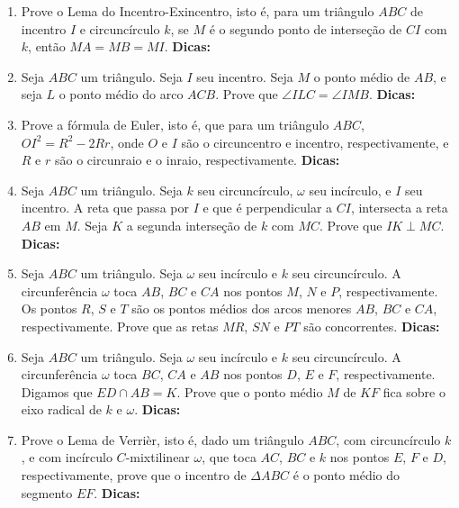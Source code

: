 \documentclass{article}
\newcommand{\dica}{\textbf{Dicas:}}
\newcommand{\iniTri}{Seja $ABC$ um triângulo}
\begin{document}
\begin{multicols}{2}
\begin{enumerate}
    \item Prove o Lema do Incentro-Exincentro, isto é, para um triângulo $ABC$ de incentro $I$ e circuncírculo $k$, se $M$ é o segundo ponto de interseção de $CI$ com $k$, então $MA=MB=MI$. \dica %
    
    \item \iniTri. Seja $I$ seu incentro. Seja $M$ o ponto médio de $AB$, e seja $L$ o ponto médio do arco $ACB$. Prove que $\angle ILC=\angle IMB$. \dica %
    
    \item Prove a fórmula de Euler, isto é, que para um triângulo $ABC$, $OI^2=R^2-2Rr$, onde $O$ e $I$ são o circuncentro e incentro, respectivamente, e $R$ e $r$ são o circunraio e o inraio, respectivamente. \dica %
    
    \item \iniTri. Seja $k$ seu circuncírculo, $\omega$ seu incírculo, e $I$ seu incentro. A reta que passa por $I$ e que é perpendicular a $CI$, intersecta a reta $AB$ em $M$. Seja $K$ a segunda interseção de $k$ com $MC$. Prove que $IK\perp MC$. \dica %
    
    \item \iniTri. Seja $\omega$ seu incírculo e $k$ seu circuncírculo. A circunferência $\omega$ toca $AB$, $BC$ e $CA$ nos pontos $M$, $N$ e $P$, respectivamente. Os pontos $R$, $S$ e $T$ são os pontos médios dos arcos menores $AB$, $BC$ e $CA$, respectivamente. Prove que as retas $MR$, $SN$ e $PT$ são concorrentes. \dica %
    
    \item \iniTri. Seja $\omega$ seu incírculo e $k$ seu circuncírculo. A circunferência $\omega$ toca $BC$, $CA$ e $AB$ nos pontos $D$, $E$ e $F$, respectivamente. Digamos que $ED\cap AB=K$. Prove que o ponto médio $M$ de $KF$ fica sobre o eixo radical de $k$ e $\omega$. \dica %
    
    \item Prove o Lema de Verrièr, isto é, dado um triângulo $ABC$, com circuncírculo $k$, e com incírculo $C$-mixtilinear $\omega$, que toca $AC$, $BC$ e $k$ nos pontos $E$, $F$ e $D$, respectivamente, prove que o incentro de $\Delta ABC$ é o ponto médio do segmento $EF$. \dica %
    

\end{enumerate}
\end{multicols}
\end{document}
